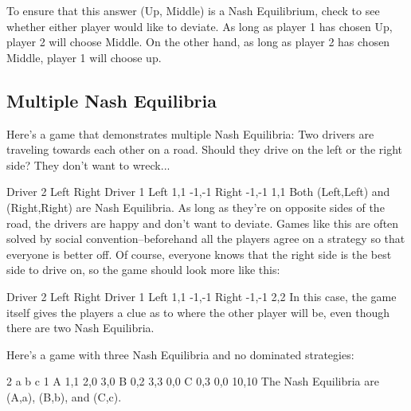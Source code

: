 \documentclass[a4paper,12pt]{article}
\begin{document}
To ensure that this answer (Up, Middle) is a Nash Equilibrium, check to see whether either player would like to deviate. As long as player 1 has chosen Up, player 2 will choose Middle. On the other hand, as long as player 2 has chosen Middle, player 1 will choose up.

\subsection{Multiple Nash Equilibria}

Here's a game that demonstrates multiple Nash Equilibria: Two drivers are traveling towards each other on a road. Should they drive on the left or the right side? They don't want to wreck...

Driver 2
Left	Right
Driver 1	Left	1,1	-1,-1
Right	-1,-1	1,1
Both (Left,Left) and (Right,Right) are Nash Equilibria. As long as they're on opposite sides of the road, the drivers are happy and don't want to deviate. Games like this are often solved by social convention--beforehand all the players agree on a strategy so that everyone is better off. Of course, everyone knows that the right side is the best side to drive on, so the game should look more like this:

Driver 2
Left	Right
Driver 1	Left	1,1	-1,-1
Right	-1,-1	2,2
In this case, the game itself gives the players a clue as to where the other player will be, even though there are two Nash Equilibria.

Here's a game with three Nash Equilibria and no dominated strategies:

2
a	b	c
1	A	1,1	2,0	3,0
B	0,2	3,3	0,0
C	0,3	0,0	10,10
The Nash Equilibria are (A,a), (B,b), and (C,c).

\end{document}
